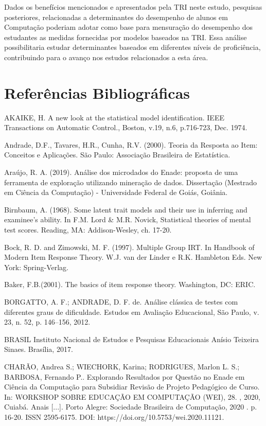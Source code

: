 \documentclass[12pt]{article}
\begin{document}
Dados os benefícios mencionados e apresentados pela TRI neste estudo, pesquisas posteriores, relacionadas a determinantes do desempenho de alunos em Computação poderiam adotar como base para mensuração do desempenho dos estudantes as medidas fornecidas por modelos baseados na TRI. Essa análise possibilitaria estudar determinantes baseados em diferentes níveis de proficiência, contribuindo para o avanço nos estudos relacionados a esta área.


\section{Referências Bibliográficas}

AKAIKE, H. A new look at the statistical model identification. IEEE Transactions on Automatic
Control., Boston, v.19, n.6, p.716-723, Dec. 1974.

Andrade, D.F., Tavares, H.R., Cunha, R.V. (2000). Teoria da Resposta ao Item: Conceitos e Aplicações. São Paulo: Associação Brasileira de Estatística.

Araújo, R. A. (2019). Análise dos microdados do Enade: proposta de uma ferramenta de exploração utilizando mineração de dados. Dissertação (Mestrado em Ciência da Computação) - Universidade Federal de Goiás, Goiânia.

Birnbaum, A. (1968). Some latent trait models and their use in inferring and examinee's ability. In F.M. Lord \& M.R. Novick, Statistical theories of mental test scores. Reading, MA: Addison-Wesley, ch. 17-20.

Bock, R. D. and Zimowski, M. F. (1997). Multiple Group IRT. In Handbook of Modern Item Response Theory. W.J. van der Linder e R.K. Hambleton Eds. New York: Spring-Verlag.

Baker, F.B.(2001). The basics of item response theory. Washington, DC: ERIC. 

BORGATTO, A. F.; ANDRADE, D. F. de. Análise clássica de testes com diferentes graus de dificuldade. Estudos em Avaliação Educacional, São Paulo, v. 23, n. 52, p. 146–156, 2012.

BRASIL Instituto Nacional de Estudos e Pesquisas Educacionais Anísio Teixeira Sinaes. Brasília, 2017.

CHARÃO, Andrea S.; WIECHORK, Karina; RODRIGUES, Marlon L. S.; BARBOSA, Fernando P.. Explorando Resultados por Questão no Enade em Ciência da Computação para Subsidiar Revisão de Projeto Pedagógico de Curso. In: WORKSHOP SOBRE EDUCAÇÃO EM COMPUTAÇÃO (WEI), 28. , 2020, Cuiabá. Anais [...]. Porto Alegre: Sociedade Brasileira de Computação, 2020 . p. 16-20. ISSN 2595-6175. DOI: https://doi.org/10.5753/wei.2020.11121.
\end{document}
